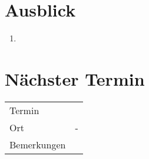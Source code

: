 \documentclass[11pt, a4paper,oneside]{scrartcl}
\begin{document}
\section{Ausblick}
\begin{enumerate}
	\item 
\end{enumerate}

\section{Nächster Termin}
\begin{tabu} to \linewidth {l X }
	\toprule
	Termin &  \\
	Ort & - \\
	Bemerkungen & \\
	\bottomrule
\end{tabu}
\end{document}
